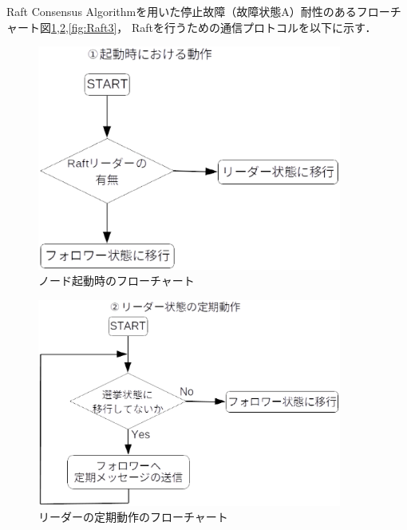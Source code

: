 \documentclass[a4paper,12pt]{jsarticle}
\begin{document}
Raft Consensus Algorithmを用いた停止故障（故障状態A）耐性のあるフローチャート図\ref{fig:Raft1},\ref{fig:Raft2},\ref{fig:Raft3}，
Raftを行うための通信プロトコルを以下に示す．

\begin{figure}[H]%
  \begin{center}
    \includegraphics[width=100mm]{pht/raft_flow_chart-algorithm1.eps}
  \end{center}
  \caption{ノード起動時のフローチャート}
  \label{fig:Raft1}
\end{figure}
%
%
\begin{figure}[H]%
  \begin{center}
    \includegraphics[width=100mm]{pht/raft_flow_chart-algorithm2.eps}
  \end{center}
  \caption{リーダーの定期動作のフローチャート}
  \label{fig:Raft2}
\end{figure}
%
%
\end{document}
